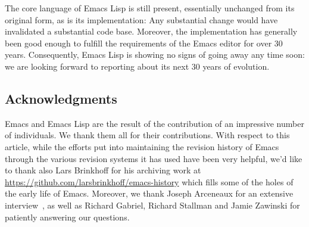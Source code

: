 \documentclass[format=acmsmall, review]{acmart}
\newcommand \Elisp {Emacs Lisp}
\begin{document}
The core language of \Elisp{} is still present, essentially unchanged
from its original form, as is its implementation:  Any substantial
change would have invalidated a substantial code base.  Moreover, the
implementation has generally been good enough to fulfill the
requirements of the Emacs editor for over 30 years.  Consequently,
\Elisp{} is showing no signs of going away any time soon: we are
looking forward to reporting about its next 30 years of evolution.




\subsection{Acknowledgments}

Emacs and \Elisp{} are the result of the contribution of an impressive
number of individuals.  We thank them all for their contributions.
With respect to this article, while the efforts put into maintaining the
revision history of Emacs through the various revision systems it has used
have been very helpful, we'd like to thank also Lars Brinkhoff for his
archiving work at \url{https://github.com/larsbrinkhoff/emacs-history} which
fills some of the holes of the early life of Emacs.
Moreover, we thank Joseph Arceneaux for an extensive
interview~\cite{Arcenaux-interview}, as well as Richard Gabriel,
Richard Stallman and Jamie Zawinski for patiently answering our questions.
\end{document}
